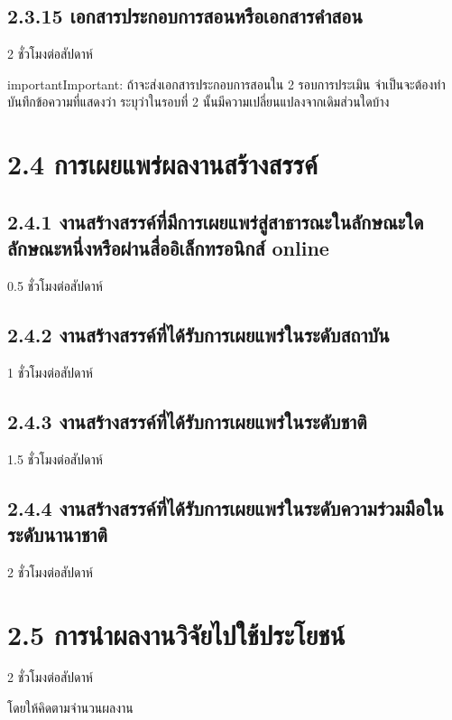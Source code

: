 \documentclass[a4paper,12pt,english]{sphinxmanual}
\begin{document}
\subsection{2.3.15 เอกสารประกอบการสอนหรือเอกสารคำสอน}
\label{\detokenize{2research:id25}}
2 ชั่วโมงต่อสัปดาห์

\begin{sphinxadmonition}{important}{Important:}
ถ้าจะส่งเอกสารประกอบการสอนใน 2 รอบการประเมิน จำเป็นจะต้องทำบันทึกข้อความที่แสดงว่า ระบุว่าในรอบที่ 2 นั้นมีความเปลี่ยนแปลงจากเดิมส่วนใดบ้าง
\end{sphinxadmonition}


\section{2.4 การเผยแพร่ผลงานสร้างสรรค์}
\label{\detokenize{2research:id26}}

\subsection{2.4.1 งานสร้างสรรค์ที่มีการเผยแพร่สู่สาธารณะในลักษณะใดลักษณะหนึ่งหรือผ่านสื่ออิเล็กทรอนิกส์ online}
\label{\detokenize{2research:online}}
0.5 ชั่วโมงต่อสัปดาห์


\subsection{2.4.2 งานสร้างสรรค์ที่ได้รับการเผยแพร่ในระดับสถาบัน}
\label{\detokenize{2research:id27}}
1 ชั่วโมงต่อสัปดาห์


\subsection{2.4.3 งานสร้างสรรค์ที่ได้รับการเผยแพร่ในระดับชาติ}
\label{\detokenize{2research:id28}}
1.5 ชั่วโมงต่อสัปดาห์


\subsection{2.4.4 งานสร้างสรรค์ที่ได้รับการเผยแพร่ในระดับความร่วมมือในระดับนานาชาติ}
\label{\detokenize{2research:id29}}
2 ชั่วโมงต่อสัปดาห์


\section{2.5 การนำผลงานวิจัยไปใช้ประโยชน์}
\label{\detokenize{2research:id30}}
2 ชั่วโมงต่อสัปดาห์

โดยให้คิดตามจำนวนผลงาน
\end{document}
